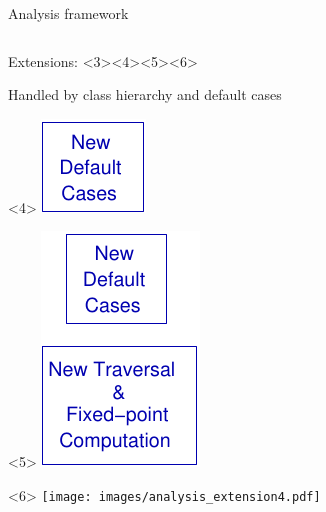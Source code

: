 \begin{frame}[t]{Analysis framework}
\begin{columns}[T]
\begin{column}{6cm}
\begin{onlyenv}
\begin{block}{Extensions: 
            <3><4><5><6>
          }
\begin{center}
\begin{onlyenv}
              Handled by class hierarchy and default cases
            \end{onlyenv}
            \begin{onlyenv}<4>
              \includegraphics{images/analysis_extension2.pdf}
            \end{onlyenv}
            \begin{onlyenv}<5>
              \includegraphics{images/analysis_extension3.pdf}
            \end{onlyenv}
            \begin{onlyenv}<6>
              \texttt{[image: images/analysis\_extension4.pdf]}
            \end{onlyenv}
          \end{center}
        \end{block}
      \end{onlyenv}
    \end{column}
  \end{columns}
  
\end{frame}
